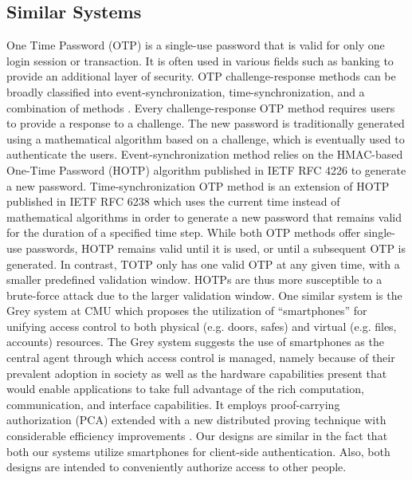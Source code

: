 \documentclass[conference]{IEEEtran}
\begin{document}
\subsection{Similar Systems}
	One Time Password (OTP) is a single-use password that is valid for only one login session or transaction. It is often used in various fields such as banking to provide an additional layer of security. OTP challenge-response methods can be broadly classified into event-synchronization, time-synchronization, and a combination of methods \cite{b4} \cite{b5}. Every challenge-response OTP method requires users to provide a response to a challenge. The new password is traditionally generated using a mathematical algorithm based on a challenge, which is eventually used to authenticate the users. Event-synchronization method relies on the HMAC-based One-Time Password (HOTP) algorithm published in IETF RFC 4226 \cite{b6} to generate a new password. Time-synchronization OTP method is an extension of HOTP published in IETF RFC 6238 \cite{b7} which uses the current time instead of mathematical algorithms in order to generate a new password that remains valid for the duration of a specified time step. While both OTP methods offer single-use passwords, HOTP remains valid until it is used, or until a subsequent OTP is generated. In contrast, TOTP only has one valid OTP at any given time, with a smaller predefined validation window. HOTPs are thus more susceptible to a brute-force attack due to the larger validation window.
	One similar system is the Grey system at CMU which proposes the utilization of “smartphones” for unifying access control to both physical (e.g. doors, safes) and virtual (e.g. files, accounts) resources. The Grey system suggests the use of smartphones as the central agent through which access control is managed, namely because of their prevalent adoption in society as well as the hardware capabilities present that would enable applications to take full advantage of the rich computation, communication, and interface capabilities. It employs proof-carrying authorization (PCA) \cite{b8} extended with a new distributed proving technique with considerable efficiency improvements \cite{b9}. Our designs are similar in the fact that both our systems utilize smartphones for client-side authentication. Also, both designs are intended to conveniently authorize access to other people. 
\end{document}
